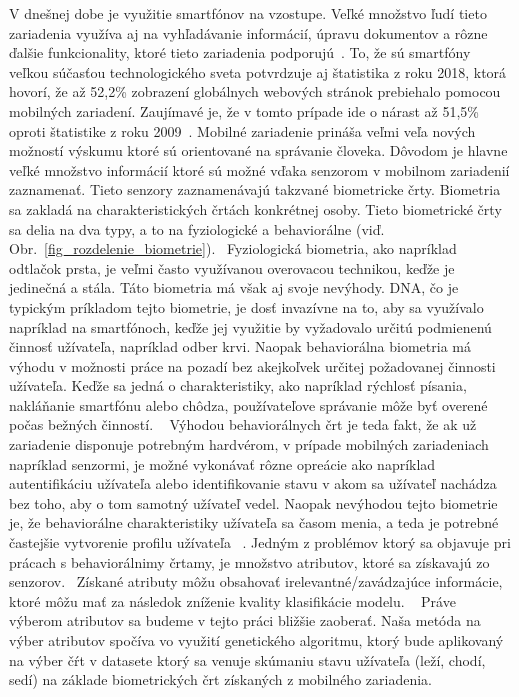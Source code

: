 \documentclass[runningheads]{llncs}
\begin{document}
V dnešnej dobe je využitie smartfónov na vzostupe. 
Veľké množstvo ľudí tieto zariadenia využíva aj na vyhľadávanie informácií, 
úpravu dokumentov a rôzne ďalšie funkcionality, 
ktoré tieto zariadenia podporujú~\cite{ref_bomhold}. 
To, že sú smartfóny veľkou súčasťou technologického sveta potvrdzuje aj 
štatistika z roku 2018, ktorá hovorí, že až 52,2\% 
zobrazení globálnych webových stránok prebiehalo pomocou mobilných zariadení. 
Zaujímavé je, že v tomto prípade ide o nárast až 51,5\% 
oproti štatistike z roku 2009~\cite{ref_statista19}. Mobilné zariadenie
prináša veľmi veľa nových možností výskumu ktoré sú orientované na správanie človeka.
Dôvodom je hlavne veľké množstvo informácií ktoré sú možné vďaka senzorom v mobilnom 
zariadenií zaznamenať. Tieto senzory zaznamenávajú takzvané biometricke črty.  
Biometria sa zakladá na charakteristických črtách konkrétnej osoby. Tieto biometrické 
črty sa delia na dva typy, a to na fyziologické a behaviorálne 
(viď. Obr.~\ref{fig_rozdelenie_biometrie}).~\cite{ref_teh} Fyziologická biometria, 
ako napríklad odtlačok prsta, je veľmi často využívanou overovacou technikou, 
keďže je jedinečná a stála. Táto biometria má však aj svoje nevýhody. 
DNA, čo je typickým príkladom tejto biometrie, je dosť invazívne na to, 
aby sa využívalo napríklad na smartfónoch, keďže jej využitie by 
vyžadovalo určitú podmienenú činnosť užívateľa, napríklad odber krvi. 
Naopak behaviorálna biometria má výhodu v možnosti práce na pozadí bez akejkoľvek 
určitej požadovanej činnosti užívateľa. Keďže sa jedná o charakteristiky, 
ako napríklad rýchlosť písania, nakláňanie smartfónu alebo chôdza, 
používateľove správanie môže byť overené počas bežných činností. ~\cite{ref_teh}
Výhodou behaviorálnych črt je teda fakt, 
že ak už zariadenie disponuje potrebným hardvérom, 
v prípade mobilných zariadeniach napríklad senzormi, 
je možné vykonávať rôzne opreácie ako napríklad autentifikáciu užívateľa alebo 
identifikovanie stavu v akom sa užívateľ nachádza bez toho, aby o 
tom samotný užívateľ vedel. Naopak nevýhodou tejto biometrie je, 
že behaviorálne charakteristiky užívateľa sa časom menia, 
a teda je potrebné častejšie vytvorenie profilu užívateľa ~\cite{ref_seyd}. 
Jedným z problémov ktorý sa objavuje pri prácach s behaviorálnimy črtamy, 
je množstvo atributov, ktoré sa získavajú zo senzorov.~\cite{ref_nascimento} 
Získané atributy môžu obsahovať irelevantné/zavádzajúce informácie, ktoré
môžu mať za následok zníženie kvality klasifikácie modelu.
~\cite{ref_babatunde,ref_lu,ref_nascimento,ref_smith,ref_zhao} Práve výberom atributov sa 
budeme v tejto práci bližšie zaoberať. Naša metóda na výber atributov spočíva vo využití 
genetického algoritmu, ktorý bude aplikovaný na výber čŕt v datasete ktorý sa venuje skúmaniu
stavu užívateľa (leží, chodí, sedí) na základe biometrických črt získaných z 
mobilného zariadenia.~\cite{ref_dataset_anguita,ref_dataset}
\end{document}
